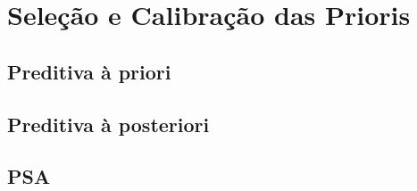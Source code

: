 \chapter{Seleção e Calibração das Prioris}

\section{Preditiva à priori}
\section{Preditiva à posteriori}
\section{PSA}
